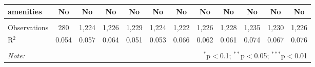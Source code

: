 \begin{table}[!htbp]
\begin{tabular}{@{\extracolsep{5pt}}lccccccccccc}
amenities & No & No & No & No & No & No & No & No & No & No & No \\ 
\hline \\[-1.8ex] 
Observations & 280 & 1,224 & 1,226 & 1,229 & 1,224 & 1,222 & 1,226 & 1,228 & 1,235 & 1,230 & 1,226 \\ 
R$^{2}$ & 0.054 & 0.057 & 0.064 & 0.051 & 0.053 & 0.066 & 0.062 & 0.061 & 0.074 & 0.067 & 0.076 \\ 
\hline 
\hline \\[-1.8ex] 
\textit{Note:}  & \multicolumn{11}{r}{$^{*}$p$<$0.1; $^{**}$p$<$0.05; $^{***}$p$<$0.01} \\ 
\end{tabular} 
\end{table} 
